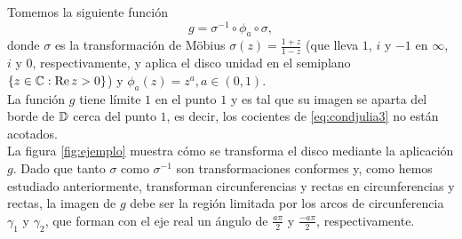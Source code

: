 \begin{example}
    \label{ex:jul2}
    Tomemos la siguiente función
    \begin{equation*}
        g = \sigma^{-1} \circ \phi_a \circ \sigma,
    \end{equation*}
    donde $\sigma$ es la transformación de Möbius $\sigma(z) = \frac{1+z}{1-z}$ (que lleva $1$, $i$ y $-1$ en $\infty$, $i$ y $0$, respectivamente, y aplica el disco unidad en el semiplano $\{z \in \mathbb{C} : \operatorname{Re} z > 0\}$) y $\phi_a(z) = z^a, a \in (0,1)$. \\

    La función $g$ tiene límite $1$ en el punto $1$ y es tal que su imagen se aparta del borde de $\mathbb{D}$ cerca del punto $1$, es decir, los cocientes de \ref{eq:condjulia3} no están acotados. \\

    La figura \ref{fig:ejemplo} muestra cómo se transforma el disco mediante la aplicación $g$. Dado que tanto $\sigma$ como $\sigma^{-1}$ son transformaciones conformes y, como hemos estudiado anteriormente, transforman circunferencias y rectas en circunferencias y rectas, la imagen de $g$ debe ser la región limitada por los arcos de circunferencia $\gamma_1$ y $\gamma_2$, que forman con el eje real un ángulo de $\frac{a \pi}{2}$ y $\frac{-a \pi}{2}$, respectivamente. \\

    \begin{figure}[h]{}
        \centering
\end{figure}
\end{example}
